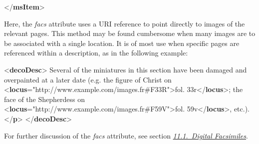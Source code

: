\begin{shaded}
{</\textbf{msItem}>}\end{shaded}\egroup\par \noindent  Here, the {\itshape facs} attribute uses a URI reference to point directly to images of the relevant pages. This method may be found cumbersome when many images are to be associated with a single location. It is of most use when specific pages are referenced within a description, as in the following example: \par\bgroup{}\exampleFont \begin{shaded}\noindent\mbox{}{<\textbf{decoDesc}>}\mbox{}\newline 
{}Several of the miniatures in this section have been damaged and overpainted\mbox{}\newline 
\hspace*{1em}\hspace*{1em} at a later date (e.g. the figure of Christ on {<\textbf{locus}\hspace*{1em}{facs}="{http://www.example.com/images.fr\#F33R}">}fol. 33r{</\textbf{locus}>}; the face of the\mbox{}\newline 
\hspace*{1em}\hspace*{1em} Shepherdess on {<\textbf{locus}\hspace*{1em}{facs}="{http://www.example.com/images.fr\#F59V}">}fol.\mbox{}\newline 
\hspace*{1em}\hspace*{1em}\hspace*{1em}\hspace*{1em} 59v{</\textbf{locus}>}, etc.).{</\textbf{p}>}\mbox{}\newline 
{</\textbf{decoDesc}>}\end{shaded}\egroup\par \noindent  For further discussion of the {\itshape facs} attribute, see section \textit{\hyperref[PHFAX]{11.1.\ Digital Facsimiles}}.\par

